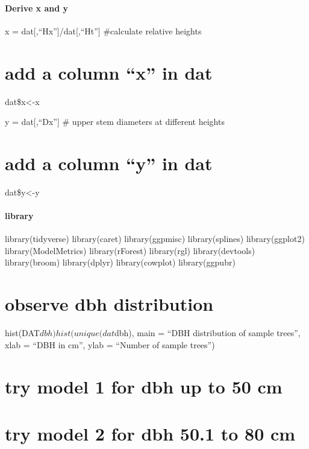 \documentclass[
]{article}
\begin{document}
\hypertarget{derive-x-and-y}{%
\paragraph{Derive x and y}\label{derive-x-and-y}}

x = dat{[},``Hx''{]}/dat{[},``Ht''{]} \#calculate relative heights

\hypertarget{add-a-column-x-in-dat}{%
\section{add a column ``x'' in dat}\label{add-a-column-x-in-dat}}

dat\$x\textless-x

y = dat{[},``Dx''{]} \# upper stem diameters at different heights

\hypertarget{add-a-column-y-in-dat}{%
\section{add a column ``y'' in dat}\label{add-a-column-y-in-dat}}

dat\$y\textless-y

\hypertarget{library}{%
\paragraph{library}\label{library}}

library(tidyverse) library(caret) library(ggpmisc) library(splines)
library(ggplot2) library(ModelMetrics) library(rForest) library(rgl)
library(devtools) library(broom) library(dplyr) library(cowplot)
library(ggpubr)

\hypertarget{observe-dbh-distribution}{%
\section{observe dbh distribution}\label{observe-dbh-distribution}}

hist(DAT\(dbh) hist(unique(dat\)dbh), main = ``DBH distribution of
sample trees'', xlab = ``DBH in cm'', ylab = ``Number of sample trees'')

\hypertarget{try-model-1-for-dbh-up-to-50-cm}{%
\section{try model 1 for dbh up to 50
cm}\label{try-model-1-for-dbh-up-to-50-cm}}

\hypertarget{try-model-2-for-dbh-50.1-to-80-cm}{%
\section{try model 2 for dbh 50.1 to 80
cm}\label{try-model-2-for-dbh-50.1-to-80-cm}}
\end{document}
